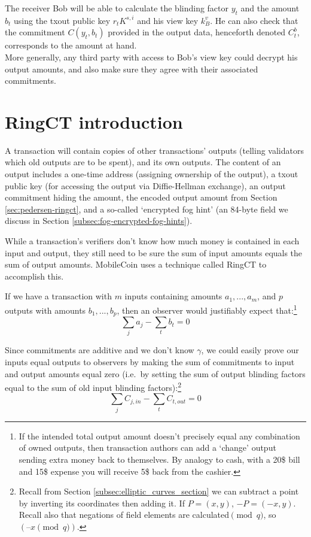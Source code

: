 The receiver Bob will be able to calculate the blinding factor $y_t$ and the amount $b_t$ using the txout public key $r_t K^{s,i}$ and his view key $k_B^v$. He can also check that the commitment $C(y_t, b_t)$ provided in the output data, henceforth denoted $C_t^b$, corresponds to the amount at hand.\\

More generally, any third party with access to Bob’s view key could decrypt his output amounts, and also make sure they agree with their associated commitments.



\section{RingCT introduction}
\label{sec:ringct-introduction}

A transaction will contain copies of other transactions' outputs (telling validators which old outputs are to be spent), and its own outputs. The content of an output includes a one-time address (assigning ownership of the output), a txout public key (for accessing the output via Diffie-Hellman exchange), an output commitment hiding the amount, the encoded output amount from Section \ref{sec:pedersen-ringct}, and a so-called `encrypted fog hint' (an 84-byte field we discuss in Section \ref{subsec:fog-encrypted-fog-hints}).

While a transaction's verifiers don’t know how much money is contained in each input and output, they still need to be sure the sum of input amounts equals the sum of output amounts. MobileCoin uses a technique called RingCT \cite{MRL-0005-ringct} to accomplish this.

If we have a transaction with $m$ inputs containing amounts \(a_1, ..., a_m\), and $p$ outputs with amounts \(b_1, ..., b_p\), then an observer would justifiably expect that:\footnote{If the intended total output amount doesn't precisely equal any combination of owned outputs, then transaction authors can add a `change' output sending extra money back to themselves. By analogy to cash, with a 20\$ bill and 15\$ expense you will receive 5\$ back from the cashier.}\vspace{.175cm}
\[\sum_j a_j - \sum_t b_t = 0\]

Since commitments are additive and we don't know $\gamma$, we could easily prove our inputs equal outputs to observers by making the sum of commitments to input and output amounts equal zero (i.e.\ by setting the sum of output blinding factors equal to the sum of old input blinding factors):\footnote{Recall from Section \ref{subsec:elliptic_curves_section} we can subtract a point by inverting its coordinates then adding it. If $P = (x, y)$, $-P = (-x, y)$. Recall also that negations of field elements are calculated$\pmod q$, so $(–x \pmod q)$.}\vspace{.175cm}
\[\sum_{j}{C_{j, in}} - \sum_{t}{C_{t, out}} = 0\]

